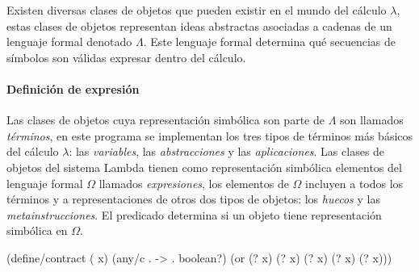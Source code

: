 \documentclass[letterpaper, twoside, openright, 11pt]{book}%
\begin{document}
\noindent Existen diversas clases de objetos que pueden existir en el mundo del cálculo \( λ \), estas clases de objetos representan ideas abstractas asociadas a cadenas de un lenguaje formal denotado \( Λ \). Este lenguaje formal determina qué secuencias de símbolos son válidas expresar dentro del cálculo.

\paragraph{Definición de expresión} Las clases de objetos cuya representación simbólica son parte de \( Λ \) son llamados \emph{términos}, en este programa se implementan los tres tipos de términos más básicos del cálculo \( λ \): las \emph{variables}, las \emph{abstracciones} y las \emph{aplicaciones}. Las clases de objetos del sistema {\Tt{}Lambda\nwendquote} tienen como representación simbólica elementos del lenguaje formal \( Ω \) llamados \emph{expresiones}, los elementos de \( Ω \) incluyen a todos los términos y a representaciones de otros dos tipos de objetos: los \emph{huecos} y las \emph{metainstrucciones}. El predicado {\Tt{}\nwendquote} determina si un objeto tiene representación simbólica en \( Ω \).

\nwenddocs{}\endmoddef\nwstartdeflinemarkup{}\nwenddeflinemarkup
(define/contract ( x)
  (any/c . -> . boolean?)
  (or (? x) (? x) (? x)
      (? x) (? x)))
\eatline
{}\nwendcode{}\nwdocspar
\end{document}

